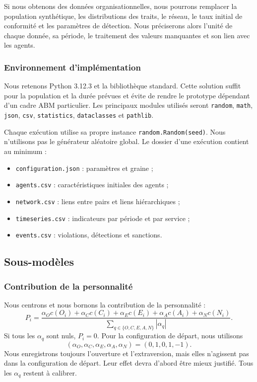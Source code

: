 \documentclass[11pt,a4paper]{article}
\newcommand{\code}[1]{\texttt{\small #1}}
\begin{document}
Si nous obtenons des données organisationnelles, nous pourrons remplacer la
population synthétique, les distributions des traits, le réseau, le taux
initial de conformité et les paramètres de détection. Nous préciserons alors
l’unité de chaque donnée, sa période, le traitement des valeurs manquantes et
son lien avec les agents.

\subsubsection{Environnement d’implémentation}

Nous retenons Python 3.12.3 et la bibliothèque standard. Cette solution suffit
pour la population et la durée prévues et évite de rendre le prototype dépendant
d’un cadre ABM particulier. Les principaux modules utilisés seront
\code{random}, \code{math}, \code{json}, \code{csv}, \code{statistics},
\code{dataclasses} et \code{pathlib}.

Chaque exécution utilise sa propre instance \code{random.Random(seed)}. Nous
n’utilisons pas le générateur aléatoire global. Le dossier d’une exécution
contient au minimum :

\begin{itemize}
  \item \code{configuration.json} : paramètres et graine ;
  \item \code{agents.csv} : caractéristiques initiales des agents ;
  \item \code{network.csv} : liens entre pairs et liens hiérarchiques ;
  \item \code{timeseries.csv} : indicateurs par période et par service ;
  \item \code{events.csv} : violations, détections et sanctions.
\end{itemize}

\subsection{Sous-modèles}

\subsubsection{Contribution de la personnalité}

Nous centrons et nous bornons la contribution de la personnalité :
\[
P_i=
\frac{\alpha_Oc(O_i)+\alpha_Cc(C_i)+\alpha_Ec(E_i)
+\alpha_Ac(A_i)+\alpha_Nc(N_i)}
{\sum_{q\in\{O,C,E,A,N\}}|\alpha_q|}.
\]
Si tous les $\alpha_q$ sont nuls, $P_i=0$. Pour la configuration de départ, nous
utilisons
\[
(\alpha_O,\alpha_C,\alpha_E,\alpha_A,\alpha_N)=(0,1,0,1,-1).
\]
Nous enregistrons toujours l’ouverture et l’extraversion, mais elles n’agissent
pas dans la configuration de départ. Leur effet devra d’abord être mieux
justifié. Tous les $\alpha_q$ restent à calibrer.
\end{document}
